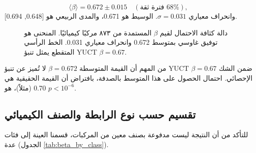 \documentclass[12pt,a4paper]{article}
\theoremstyle{remark}
\begin{document}
	\begin{equation}
		\langle \beta \rangle = 0.672 \pm 0.015 \quad (\text{فترة ثقة } 68\%), 
		\label{eq:beta_mean}
	\end{equation}
	وانحراف معياري \(\sigma = 0.031\). الوسيط هو 0.671، والمدى الربيعي هو [0.648, 0.694].
	
	\begin{figure}[htbp]
		\centering
		\caption{دالة كثافة الاحتمال لقيم \(\beta\) المستمدة من ٨٧٣ مركبًا كيميائيًا. المنحنى هو توفيق غاوسي بمتوسط 0.672 وانحراف معياري 0.031. الخط الرأسي المتقطع يمثل تنبؤ YUCT \(\beta = 0.67\).}
		\label{fig:beta_distribution}
	\end{figure}
	
	من المهم أن القيمة المتوسطة \(\beta = 0.672\) لا تُميز عن تنبؤ YUCT \(\beta = 0.67\) ضمن الشك الإحصائي. احتمال الحصول على هذا المتوسط بالصدفة، بافتراض أن القيمة الحقيقية هي 0.70 (مثلاً)، هو \(p < 10^{-6}\).
	
	\subsection{تقسيم حسب نوع الرابطة والصنف الكيميائي}
	
	للتأكد من أن النتيجة ليست مدفوعة بصنف معين من المركبات، قسمنا العينة إلى فئات عدة (الجدول \ref{tab:beta_by_class}).
	
\end{document}
